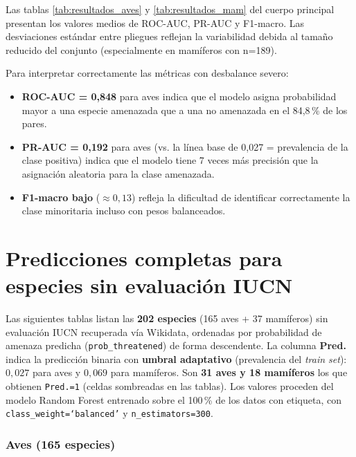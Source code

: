 \documentclass[12pt,a4paper]{article}
\begin{document}
Las tablas \ref{tab:resultados_aves} y \ref{tab:resultados_mam} del cuerpo principal
presentan los valores medios de ROC-AUC, PR-AUC y F1-macro.
Las desviaciones estándar entre pliegues reflejan la variabilidad debida al tamaño
reducido del conjunto (especialmente en mamíferos con n=189).

Para interpretar correctamente las métricas con desbalance severo:
\begin{itemize}[nosep]
  \item \textbf{ROC-AUC = 0,848} para aves indica que el modelo asigna probabilidad mayor
        a una especie amenazada que a una no amenazada en el 84,8\,\% de los pares.
  \item \textbf{PR-AUC = 0,192} para aves (vs. la línea base de 0,027 = prevalencia de
        la clase positiva) indica que el modelo tiene 7 veces más precisión que la
        asignación aleatoria para la clase amenazada.
  \item \textbf{F1-macro bajo} ($\approx 0,13$) refleja la dificultad de identificar
        correctamente la clase minoritaria incluso con pesos balanceados.
\end{itemize}

\section{Predicciones completas para especies sin evaluación IUCN}
\label{anx:predicciones}

Las siguientes tablas listan las \textbf{202 especies} (165 aves + 37 mamíferos) sin
evaluación IUCN recuperada vía Wikidata, ordenadas por probabilidad de amenaza predicha
(\texttt{prob\_threatened}) de forma descendente.
La columna \textbf{Pred.} indica la predicción binaria con \textbf{umbral adaptativo}
(prevalencia del \textit{train set}): $0{,}027$ para aves y $0{,}069$ para mamíferos.
Son \textbf{31 aves y 18 mamíferos} los que obtienen \texttt{Pred.=1}
(celdas sombreadas en las tablas).
Los valores proceden del modelo Random Forest entrenado sobre el 100\,\% de los datos
con etiqueta, con \texttt{class\_weight=`balanced'} y \texttt{n\_estimators=300}.

\subsubsection*{Aves (165 especies)}
\end{document}
